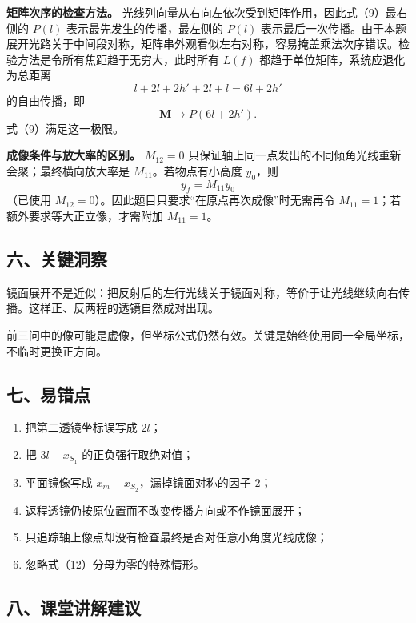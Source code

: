 \documentclass[12pt,a4paper,UTF8]{ctexart}
\newcommand{\tightlist}{\setlength{\itemsep}{0pt}\setlength{\parskip}{0pt}}
\begin{document}
\textbf{矩阵次序的检查方法。}
光线列向量从右向左依次受到矩阵作用，因此式（9）最右侧的 \(P(l)\)
表示最先发生的传播，最左侧的 \(P(l)\)
表示最后一次传播。由于本题展开光路关于中间段对称，矩阵串外观看似左右对称，容易掩盖乘法次序错误。检验方法是令所有焦距趋于无穷大，此时所有
\(L(f)\) 都趋于单位矩阵，系统应退化为总距离 \[
l+2l+2h'+2l+l=6l+2h'
\] 的自由传播，即 \[
\boldsymbol M\to P(6l+2h').
\] 式（9）满足这一极限。

\textbf{成像条件与放大率的区别。} \(M_{12}=0\)
只保证轴上同一点发出的不同倾角光线重新会聚；最终横向放大率是
\(M_{11}\)。若物点有小高度 \(y_0\)，则 \[
y_f=M_{11}y_0
\] （已使用 \(M_{12}=0\)）。因此题目只要求``在原点再次成像''时无需再令
\(M_{11}=1\)；若额外要求等大正立像，才需附加 \(M_{11}=1\)。

\subsection{六、关键洞察}\label{ux516dux5173ux952eux6d1eux5bdf-4}

镜面展开不是近似：把反射后的左行光线关于镜面对称，等价于让光线继续向右传播。这样正、反两程的透镜自然成对出现。

前三问中的像可能是虚像，但坐标公式仍然有效。关键是始终使用同一全局坐标，不临时更换正方向。

\subsection{七、易错点}\label{ux4e03ux6613ux9519ux70b9-4}

\begin{enumerate}
\def\labelenumi{\arabic{enumi}.}
\tightlist
\item
  把第二透镜坐标误写成 \(2l\)；
\item
  把 \(3l-x_{S_1}\) 的正负强行取绝对值；
\item
  平面镜像写成 \(x_m-x_{S_2}\)，漏掉镜面对称的因子 \(2\)；
\item
  返程透镜仍按原位置而不改变传播方向或不作镜面展开；
\item
  只追踪轴上像点却没有检查最终是否对任意小角度光线成像；
\item
  忽略式（12）分母为零的特殊情形。
\end{enumerate}

\subsection{八、课堂讲解建议}\label{ux516bux8bfeux5802ux8bb2ux89e3ux5efaux8bae-4}
\end{document}
